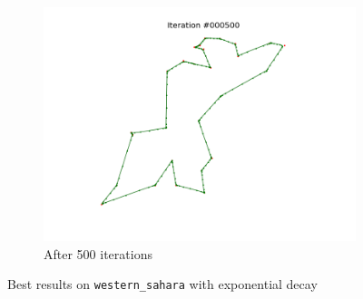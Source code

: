 \documentclass[11pt]{article}
\begin{document}
\begin{figure}
\begin{subfigure}{.33\textwidth}
  \includegraphics[trim={4cm 2cm 4cm 2cm}, clip=true,width=\linewidth]{w_500.png}
  \caption{After 500 iterations}
\end{subfigure}
\caption{Best results on \texttt{western\_sahara} with exponential decay}
\label{fig:bsahara}
\end{figure}
\end{document}
